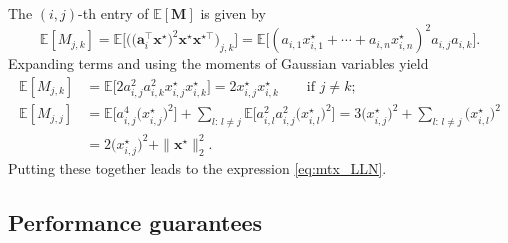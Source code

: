 The $(i,j)$-th entry of  $\mathbb{E}[\bm{M}]$ is given by
%
$$
\mathbb{E}[M_{j,k}]=\mathbb{E}
\big[\big(\big(\bm{a}_{i}^{\top}\bm{x}^{\star}\big)^{2}\bm{x}^{\star}\bm{x}^{\star\top}\big)_{j,k} \big]
=\mathbb{E}\big[(a_{i,1}x_{i,1}^{\star}+\cdots+a_{i,n}x_{i,n}^{\star})^{2}a_{i,j}a_{i,k}\big] .
$$
%
Expanding  terms and using the moments of Gaussian variables yield
%
\begin{align*}
\mathbb{E}[M_{j,k}] & =\mathbb{E}\big[2a_{i,j}^{2}a_{i,k}^{2}x_{i,j}^{\star}x_{i,k}^{\star}\big]=2x_{i,j}^{\star}x_{i,k}^{\star}\qquad\text{if }j\neq k;\\
\mathbb{E}[M_{j,j}] & =\mathbb{E}\big[a_{i,j}^{4}\big(x_{i,j}^{\star}\big)^{2}\big]+\sum_{l:\,l\neq j}\mathbb{E}\big[a_{i,l}^{2}a_{i,j}^{2}\big(x_{i,l}^{\star}\big)^{2}\big]=3\big(x_{i,j}^{\star}\big)^{2}+\sum_{l:\,l\neq j}\big(x_{i,l}^{\star}\big)^{2}\\
 & = 2\big(x_{i,j}^{\star}\big)^{2} + \|\bm{x}^{\star}\|_{2}^{2}.
\end{align*}
%
Putting these together leads to the expression \eqref{eq:mtx_LLN}.






%





\subsection{Performance guarantees}

